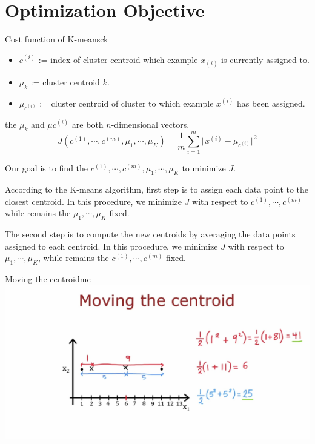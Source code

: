 \section{Optimization Objective}
\begin{thmbox}{Cost function of K-means}{ck}
    \begin{itemize}
        \item $c^{(i)}$ := index of cluster centroid which example $x_{(i)}$ is currently assigned to.
        \item $\mu_k$ := cluster centroid $k$.
        \item $\mu_{c^{(i)}}$ := cluster centroid of cluster to which example $x^{(i)}$ has been assigned. 
    \end{itemize}
    the $\mu_k$ and $\mu{c^{(i)}}$ are both $n$-dimensional vectors.
    \tcblower
    \begin{equation}
        J(c^{(1)}, \cdots, c^{(m)}, \mu_1, \cdots, \mu_K) = \frac{1}{m} \sum_{i=1}^{m} \Vert x^{(i)} - \mu_{c^{(i)}}\Vert ^2
    \end{equation}
\end{thmbox}

\begin{notebox}
    \hspace{1em}Our goal is to find the $c^{(1)}, \cdots, c^{(m)}, \mu_1, \cdots, \mu_K$ to minimize $J$.\par
    \hspace{1em}According to the K-means algorithm, first step is to assign each data point to the closest centroid.
    In this procedure, we minimize $J$ with respect to $c^{(1)}, \cdots, c^{(m)}$ 
    while remains the $\mu_1, \cdots, \mu_K$ fixed.\par
    \hspace{1em}The second step is to compute the new centroids by averaging the data points assigned to each centroid.
    In this procedure, we minimize $J$ with respect to $\mu_1, \cdots, \mu_K$, 
    while remains the $c^{(1)}, \cdots, c^{(m)}$ fixed.
\end{notebox}

\begin{exbox}{Moving the centroid}{mc}
    \includegraphics*[width=\textwidth]{images/km2}
\end{exbox}

